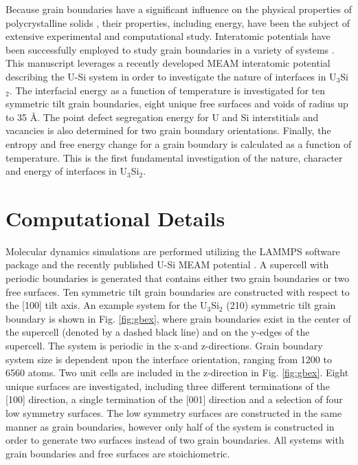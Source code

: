 \documentclass[review]{elsarticle}
\providecommand{\DIFaddtex}[1]{{\protect\color{blue}\uwave{#1}}} %
\providecommand{\DIFaddbegin}{} %
\providecommand{\DIFaddend}{} %
\providecommand{\DIFadd}[1]{\texorpdfstring{\DIFaddtex{#1}}{#1}} %
\newcommand{\DIFaddincludegraphics}[2][]{{\color{blue}\fbox{\DIFOincludegraphics[#1]{#2}}}} %
\DeclareRobustCommand{\DIFaddbegin}{\DIFOaddbegin \let\includegraphics\DIFaddincludegraphics} %
\DeclareRobustCommand{\DIFaddend}{\DIFOaddend \let\includegraphics\DIFOincludegraphics} %
\begin{document}
Because grain boundaries have a significant influence on the physical properties of polycrystalline solids \cite{brandon2010, harmer2010}, their properties, including energy, have been the subject of extensive experimental and computational study. Interatomic potentials have been successfully employed to study grain boundaries in a variety of systems \cite{morita1997, wolf1989bcc1, wolf1990bcc2, ratanaphan2015, novoselov2014, tschopp2012probing, hahn2016}. This manuscript leverages a recently developed MEAM interatomic potential describing the U-Si system in order to investigate the nature of interfaces in U$_{3}$Si$_{2}$. The interfacial energy as a function of temperature is investigated for ten symmetric tilt grain boundaries, eight unique free surfaces and voids of radius up to 35 {\AA}. The point defect segregation energy for U and Si interstitials and vacancies is also determined for two grain boundary orientations. Finally, the entropy and free energy change for a grain boundary is calculated as a function of temperature. This is the first fundamental investigation of the nature, character and energy of interfaces in U$_{3}$Si$_{2}$. 

\section{Computational Details}
Molecular dynamics simulations are performed utilizing the LAMMPS \cite{plimpton1995} software package and the recently published U-Si MEAM potential \cite{beelerUSi}. A supercell with periodic boundaries is generated that contains either two grain boundaries or two free surfaces. Ten symmetric tilt grain boundaries are constructed with respect to the [100] tilt axis. An example system for the U$_{3}$Si$_{2}$ (210) symmetric tilt grain boundary is shown in Fig. \ref{fig:gbex}, where grain boundaries exist in the center of the supercell (denoted by a dashed black line) and on the y-edges of the supercell. The system is periodic in the x-\DIFaddbegin \DIFadd{, y- }\DIFaddend and z-directions. Grain boundary system size is dependent upon the interface orientation, ranging from 1200 to 6560 atoms. Two unit cells are included in the z-direction in Fig. \ref{fig:gbex}. Eight unique surfaces are investigated, including three different terminations of the [100] direction, a single termination of the [001] direction and a selection of four low symmetry surfaces. The low symmetry surfaces are constructed in the same manner as grain boundaries, however only half of the system is constructed in order to generate two surfaces instead of two grain boundaries. All systems with grain boundaries and free surfaces are stoichiometric. 
\end{document}
